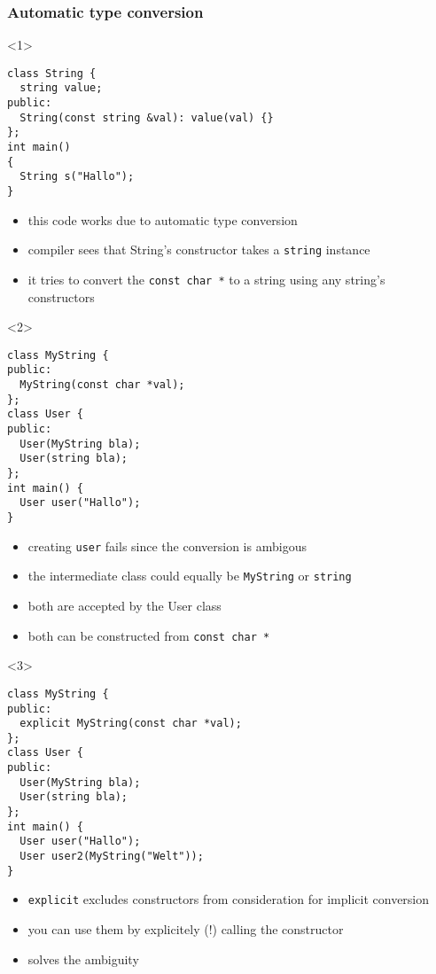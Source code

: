 \documentclass{slides}
\begin{document}
\begin{frame}[fragile]
  \frametitle{Automatic type conversion}

  \begin{onlyenv}<1>
\begin{lstlisting}
class String {
  string value;
public:
  String(const string &val): value(val) {}
};
int main()
{
  String s("Hallo");
}
\end{lstlisting}

    \begin{itemize}
    \item this code works due to \alert{automatic type conversion}
    \item compiler sees that String's constructor takes a
      \lstinline!string! instance
    \item it tries to convert the \lstinline!const char *! to a string
      using any string's constructors
    \end{itemize}
  \end{onlyenv}

  \begin{onlyenv}<2>
\begin{lstlisting}
class MyString {
public:
  MyString(const char *val);
};
class User {
public:
  User(MyString bla);
  User(string bla);
};
int main() {
  User user("Hallo");
}
\end{lstlisting}

    \begin{itemize}
    \item creating \lstinline!user! fails since the conversion is
      \alert{ambigous}
    \item the intermediate class could equally be \lstinline!MyString!
      or \lstinline!string!
    \item both are accepted by the User class
    \item both can be constructed from \lstinline!const char *!
    \end{itemize}
  \end{onlyenv}

  \begin{onlyenv}<3>
\begin{lstlisting}[emph={explicit}]
class MyString {
public:
  explicit MyString(const char *val);
};
class User {
public:
  User(MyString bla);
  User(string bla);
};
int main() {
  User user("Hallo");
  User user2(MyString("Welt"));
}
\end{lstlisting}

    \begin{itemize}
    \item \lstinline!explicit! excludes constructors from
      consideration for implicit conversion
    \item you can use them by explicitely (!) calling the constructor
    \item solves the ambiguity
    \end{itemize}
  \end{onlyenv}
\end{frame}
\end{document}
